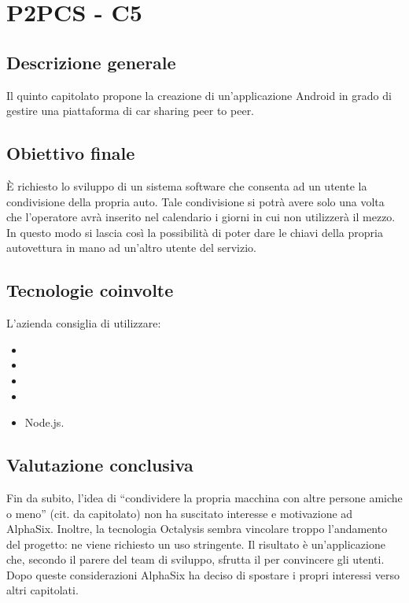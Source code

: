 \section{P2PCS - C5} \label{c5}
    \subsection{Descrizione generale}
    Il quinto capitolato propone la creazione di un'applicazione Android in grado di gestire una piattaforma di car sharing peer to peer.

    \subsection{Obiettivo finale}
    \`E richiesto lo sviluppo di un sistema software che consenta ad un utente la condivisione della propria auto. Tale condivisione si potrà
    avere solo una volta che l'operatore avrà inserito nel calendario i giorni in cui non utilizzerà il mezzo.
    In questo modo si lascia così la possibilità di poter dare le chiavi della propria autovettura in mano ad un'altro utente del servizio.

    \subsection{Tecnologie coinvolte}
    L'azienda consiglia di utilizzare:
        \begin{itemize}
        \item {}
        \item {}
        \item {}
        \item {}
        \item Node.js.
    \end{itemize}

    \subsection{Valutazione conclusiva}
    Fin da subito, l'idea di ``condividere la propria macchina con altre persone amiche o meno'' (cit. da capitolato) non ha suscitato interesse
    e motivazione ad AlphaSix. Inoltre, la tecnologia Octalysis sembra vincolare troppo l'andamento del progetto: ne viene richiesto un
    uso stringente. Il risultato è un'applicazione che, secondo il parere del team di sviluppo, sfrutta il  per convincere gli utenti.
    Dopo queste considerazioni AlphaSix ha deciso di spostare i propri interessi verso altri capitolati.

